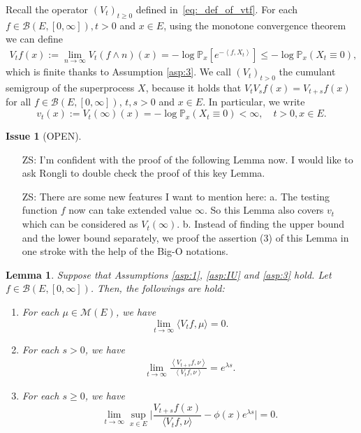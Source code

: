 \documentclass[12pt,a4paper]{amsart}
\numberwithin{equation}{section}
\theoremstyle{plain}
\newtheorem{lem}[thm]{Lemma}
\theoremstyle{definition}
\newtheorem{iss}{Issue}
\begin{document}
Recall the operator $(V_t)_{t\geq 0}$ defined in~\eqref{eq:_def_of_vtf}.
For each $f\in \mathcal B(E, [0,\infty]),t> 0$ and $x\in E$, using the monotone convergence theorem we can define
\begin{align}
\label{eq:Vtf_is_finite}
  V_tf(x)
  := \lim_{n\to \infty}V_t(f\wedge n)(x)
  = - \log \mathbb P_x[e^{-\left\langle f, X_t \right\rangle}] 
  \leq - \log \mathbb P_x(X_t \equiv 0),
\end{align}
which is finite thanks to Assumption \ref{asp:3}.
We call $(V_t)_{t> 0}$ the cumulant semigroup of the superprocess $X$, because it holds that $V_tV_sf(x) = V_{t+s}f(x)$ for all $f\in \mathcal B(E,[0,\infty])$, $t,s > 0$ and $x\in E$. 
In particular, we write
\[
	v_t(x):= V_t(\infty)(x)= -\log \mathbb P_x(X_t \equiv 0) < \infty,
  \quad t > 0, x\in E.
\]
\begin{iss}[OPEN]~
  \begin{itemize}
  \item[ZS:]
I'm confident with the proof of the following Lemma now. 
I would like to ask Rongli to double check the proof of this key Lemma.
\item[ZS:]
There are some new features I want to mention here:
a. The testing function $f$ now can take extended value $\infty$. So this Lemma also covers $v_t$ which can be considered as $V_t(\infty)$.
b. Instead of finding the upper bound and the lower bound separately, we proof the assertion (3) of this Lemma in one stroke with the help of the Big-O notations.
  \end{itemize}
\end{iss}
\begin{lem}
\label{lem:asmptotic_of_Vtf}
  Suppose that Assumptions \ref{asp:1}, \ref{asp:IU} and \ref{asp:3} hold. 
  Let $f\in \mathcal B(E, [0,\infty])$.
  Then, the followings are hold:
  \begin{enumerate}
  \item \label{sublem:Vtf_vanish}
    For each $\mu \in \mathcal M(E)$, we have
    \[
      \lim_{t\rightarrow\infty}\langle V_tf,\mu\rangle=0.
    \]
   \item \label{lem:extinct_2_1}
For each $s>0$, we have
     \begin{align}
       \lim_{t\to \infty} \frac{\left\langle V_{t+s}f,\nu\right\rangle}{\left\langle V_t f,\nu\right\rangle} 
= e^{\lambda s}.
     \end{align}
  \item \label{lem:extinct:3}
    For each $s\geq 0$, we have
    \begin{equation} \label{eq:ont_point_ratio_limit}
      \lim_{t\to \infty} \sup_{x\in E}\Big|\frac{V_{t+s}f(x)}{\langle V_tf,\nu\rangle } - \phi(x)e^{\lambda s} \Big|
      =0.
    \end{equation}
  \end{enumerate}
\end{lem}
\end{document}
